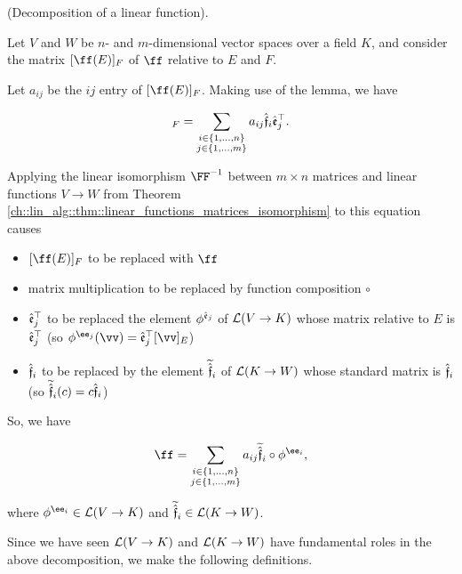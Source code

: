 \begin{deriv}
\label{ch::motivated_intro::deriv::decomposition_of_a_linear_function}
    (Decomposition of a linear function).

    Let $V$ and $W$ be $n$- and $m$-dimensional vector spaces over a field $K$, and consider the matrix $[\ff(E)]_F$ of $\ff$ relative to $E$ and $F$.
    
    Let $a_{ij}$ be the $ij$ entry of $[\ff(E)]_F$. Making use of the lemma, we have

    \begin{align*}
        [\ff(E)]_F = \sum_{\substack{i \in \{1, ..., n\} \\ j \in \{1, ..., m\}}} a_{ij} \sff_i \see_j^\top.
    \end{align*}

    Applying the linear isomorphism $\FF^{-1}$ between $m \times n$ matrices and linear functions $V \rightarrow W$ from Theorem \ref{ch::lin_alg::thm::linear_functions_matrices_isomorphism} to this equation causes  \begin{itemize}
        \item $[\ff(E)]_F$ to be replaced with $\ff$
        \item matrix multiplication to be replaced by function composition $\circ$
        \item $\hat{\mathfrak{e}}_j^\top$ to be replaced the element $\phi^{\hat{\mathfrak{e}}_j}$ of $\mathcal{L}(V \rightarrow K)$ whose matrix relative to $E$ is $\hat{\mathfrak{e}}_j^\top$ (so $\phi^{\ee_j}(\vv) = \see_j^\top [\vv]_E$)
        \item $\hat{\mathfrak{f}}_i$ to be replaced by the element $\widetilde{\hat{\mathfrak{f}}}_i$ of $\mathcal{L}(K \rightarrow W)$ whose standard matrix is $\hat{\mathfrak{f}}_i$ (so $\widetilde{\hat{\mathfrak{f}}}_i(c) = c\hat{\mathfrak{f}}_i$)
    \end{itemize}

    So, we have

    \begin{align*}
        \ff = \sum_{\substack{i \in \{1, ..., n\} \\ j \in \{1, ..., m\}}} a_{ij} \tsff_i \circ \phi^{\ee_i},
    \end{align*}

    where $\phi^{\ee_i} \in \LLLL(V \rightarrow K)$ and $\widetilde{\hat{\mathfrak{f}}}_i \in \mathcal{L}(K \rightarrow W)$.
\end{deriv}

\newpage

Since we have seen $\mathcal{L}(V \rightarrow K)$ and $\mathcal{L}(K \rightarrow W)$ have fundamental roles in the above decomposition, we make the following definitions.

